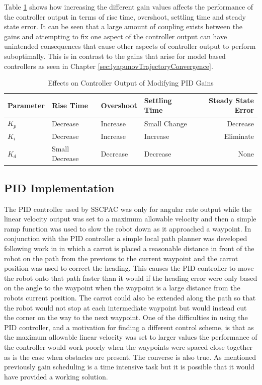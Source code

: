 Table \ref{tab:PIDGainEffects} shows how increasing the different gain values affects the performance of the controller output in terms of rise time, overshoot, settling time and steady state error. It can be seen that a large amount of coupling exists between the gains and attempting to fix one aspect of the controller output can have unintended consequences that cause other aspects of controller output to perform suboptimally. This is in contrast to the gains that arise for model based controllers as seen in Chapter \ref{sec:lyapunovTrajectoryConvergence}.

\begin{table}[ht!]
\caption{Effects on Controller Output of Modifying PID Gains}
\small
\centering
\begin{tabular}{@{}llllr@{}} \toprule
Parameter    & Rise Time      & Overshoot & Settling Time & Steady State Error \\ \midrule
$K_p$        & Decrease       & Increase  & Small Change  & Decrease \\
$K_i$        & Decrease       & Increase  & Increase      & Eliminate \\
$K_d$        & Small Decrease & Decrease  & Decrease      & None \\ \bottomrule
\end{tabular}
\label{tab:PIDGainEffects}
\end{table}

\subsection{PID Implementation}
The PID controller used by SSCPAC was only for angular rate output while the linear velocity output was set to a maximum allowable velocity and then a simple ramp function was used to slow the robot down as it approached a waypoint. In conjunction with the PID controller a simple local path planner was developed following work in \cite{Hogg02} in which a carrot is placed a reasonable distance in front of the robot on the path from the previous to the current waypoint and the carrot position was used to correct the heading. This causes the PID controller to move the robot onto that path faster than it would if the heading error were only based on the angle to the waypoint when the waypoint is a large distance from the robots current position. The carrot could also be extended along the path so that the robot would not stop at each intermediate waypoint but would instead cut the corner on the way to the next waypoint. One of the difficulties in using the PID controller, and a motivation for finding a different control scheme, is that as the maximum allowable linear velocity was set to larger values the performance of the controller would work poorly when the waypoints were spaced close together as is the case when obstacles are present. The converse is also true. As mentioned previously gain scheduling is a time intensive task but it is possible that it would have provided a working solution.

